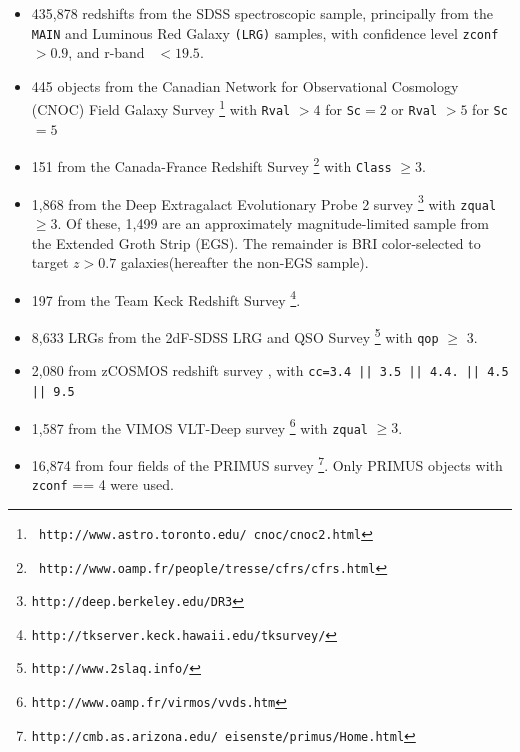 \documentclass{emulateapj}
\begin{document}
\begin{itemize} 

    \item 435,878 redshifts from the SDSS spectroscopic sample,
principally from the \texttt{MAIN} and Luminous Red Galaxy \texttt{(LRG)}
samples, with confidence level \texttt{zconf}$ > 0.9$, and r-band
\cmodelmag\ $ <19.5$.


    \item 445 objects from the Canadian Network for Observational
Cosmology (CNOC) Field Galaxy Survey \cite[CNOC2;][]{yee00}\footnote{\tt
http://www.astro.toronto.edu/~cnoc/cnoc2.html} with \texttt{Rval} $>4$
for \texttt{Sc}$=2$ or \texttt{Rval} $> 5$ for \texttt{Sc}$=5$

    \item 151 from the Canada-France Redshift
Survey \cite[CFRS;][]{lilly95}\footnote{\tt
http://www.oamp.fr/people/tresse/cfrs/cfrs.html} with \texttt{Class} $\geq 3$.

    \item 1,868 from the Deep Extragalact Evolutionary Probe 2 survey
\citep[DEEP2;][]{weiner05}\footnote{\tt http://deep.berkeley.edu/DR3}
with \texttt{zqual} $\geq 3$. 
Of these, 1,499 are an approximately magnitude-limited sample from the Extended Groth Strip (EGS).
The remainder is BRI color-selected to target $z>0.7$ galaxies(hereafter the non-EGS sample). 

    \item 197 from the Team Keck Redshift Survey \cite[TKRS;][]{wirth04}\footnote{\tt http://tkserver.keck.hawaii.edu/tksurvey/}.

    \item 8,633 LRGs from the 2dF-SDSS LRG and QSO Survey \cite[2SLAQ;][]{cannon06}\footnote{\tt http://www.2slaq.info/} with \texttt{qop} $\geq$ 3.

    \item  2,080 from zCOSMOS redshift survey \cite{lilly07}, with  \texttt{cc=3.4 || 3.5 || 4.4.  || 4.5 || 9.5}
    
    \item 1,587 from the VIMOS VLT-Deep survey \cite[VVDS;][]{garilli08}\footnote{\tt http://www.oamp.fr/virmos/vvds.htm} with \texttt{zqual} $\geq 3$.

    \item 16,874 from four fields of the PRIMUS survey \cite[PRIMUS;][]{coil10}\footnote{\tt http://cmb.as.arizona.edu/~eisenste/primus/Home.html}.  Only PRIMUS objects with \texttt{zconf} == 4 were used.      
\end{itemize}
\end{document}
